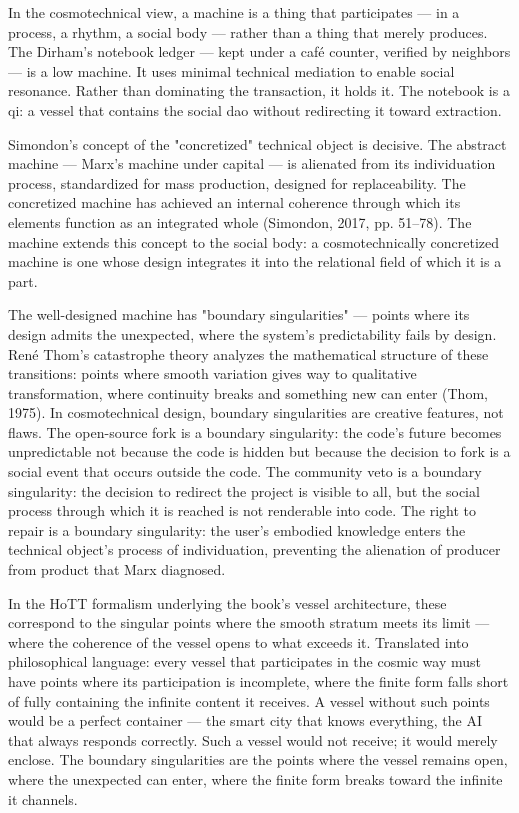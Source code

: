 In the cosmotechnical view, a machine is a thing that participates — in a process, a rhythm, a social body — rather than a thing that merely produces. The Dirham's notebook ledger — kept under a café counter, verified by neighbors — is a low machine. It uses minimal technical mediation to enable social resonance. Rather than dominating the transaction, it holds it. The notebook is a qi: a vessel that contains the social dao without redirecting it toward extraction.

Simondon's concept of the "concretized" technical object is decisive. The abstract machine — Marx's machine under capital — is alienated from its individuation process, standardized for mass production, designed for replaceability. The concretized machine has achieved an internal coherence through which its elements function as an integrated whole (Simondon, 2017, pp. 51–78). The  machine extends this concept to the social body: a cosmotechnically concretized machine is one whose design integrates it into the relational field of which it is a part.

The well-designed machine has "boundary singularities" — points where its design admits the unexpected, where the system's predictability fails by design. René Thom's catastrophe theory analyzes the mathematical structure of these transitions: points where smooth variation gives way to qualitative transformation, where continuity breaks and something new can enter (Thom, 1975). In cosmotechnical design, boundary singularities are creative features, not flaws. The open-source fork is a boundary singularity: the code's future becomes unpredictable not because the code is hidden but because the decision to fork is a social event that occurs outside the code. The community veto is a boundary singularity: the decision to redirect the project is visible to all, but the social process through which it is reached is not renderable into code. The right to repair is a boundary singularity: the user's embodied knowledge enters the technical object's process of individuation, preventing the alienation of producer from product that Marx diagnosed.

In the HoTT formalism underlying the book's vessel architecture, these correspond to the singular points where the smooth stratum meets its limit — where the coherence of the vessel opens to what exceeds it. Translated into philosophical language: every vessel that participates in the cosmic way must have points where its participation is incomplete, where the finite form falls short of fully containing the infinite content it receives. A vessel without such points would be a perfect container — the smart city that knows everything, the AI that always responds correctly. Such a vessel would not receive; it would merely enclose. The boundary singularities are the points where the vessel remains open, where the unexpected can enter, where the finite form breaks toward the infinite it channels.

